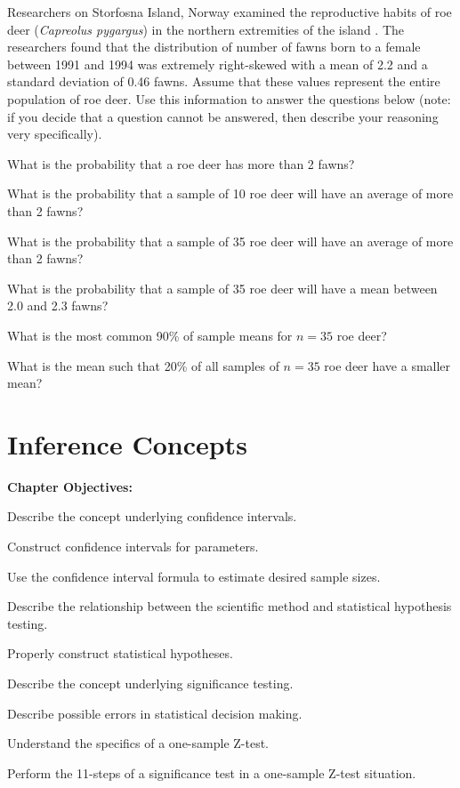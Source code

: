 \documentclass[10pt,openany]{book}\usepackage[]{graphicx}\usepackage[]{color}
\begin{document}
\begin{hwsection}
  \item \label{hwprob:CLTRoeDeer} \rhw{} Researchers on Storfosna Island, Norway examined the reproductive habits of roe deer (\emph{Capreolus pygargus}) in the northern extremities of the island \citep{AndersenLinnell2000}.  The researchers found that the distribution of number of fawns born to a female between 1991 and 1994 was extremely right-skewed with a mean of 2.2 and a standard deviation of 0.46 fawns.  Assume that these values represent the entire population of roe deer.  Use this information to answer the questions below (note: if you decide that a question cannot be answered, then describe your reasoning very specifically).
    \begin{Enumerate}
      \item What is the probability that a roe deer has more than 2 fawns?
      \item What is the probability that a sample of 10 roe deer will have an average of more than 2 fawns?
      \item What is the probability that a sample of 35 roe deer will have an average of more than 2 fawns?
      \item What is the probability that a sample of 35 roe deer will have a mean between 2.0 and 2.3 fawns?
      \item What is the most common 90\% of sample means for $n=35$ roe deer?
      \item What is the mean such that 20\% of all samples of $n=35$ roe deer have a smaller mean?
    \end{Enumerate}

\end{hwsection}



\chapter{Inference Concepts} \label{chap:Inference}
\begin{ChapObj}{\boxwidth}
  \textbf{Chapter Objectives:}
  \begin{Enumerate}
    \item Describe the concept underlying confidence intervals.
    \item Construct confidence intervals for parameters.
    \item Use the confidence interval formula to estimate desired sample sizes.
    \item Describe the relationship between the scientific method and statistical hypothesis testing.
    \item Properly construct statistical hypotheses.
    \item Describe the concept underlying significance testing.
    \item Describe possible errors in statistical decision making.
    \item Understand the specifics of a one-sample Z-test.
    \item Perform the 11-steps of a significance test in a one-sample Z-test situation.
  \end{Enumerate}
\end{ChapObj}
\end{document}
